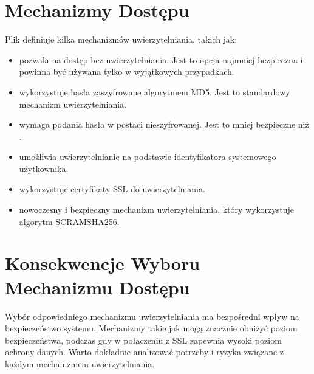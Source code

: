 \documentclass[letterpaper,10pt,polish]{sphinxmanual}
\begin{document}
\section{Mechanizmy Dostępu}
\label{\detokenize{sprawozdanie/source/rozdzialy/rozdzial1:mechanizmy-dostepu}}
\sphinxAtStartPar
Plik  definiuje kilka mechanizmów uwierzytelniania,
takich jak:
\begin{itemize}
\item {} 
\sphinxAtStartPar
{} \sphinxhyphen{} pozwala na dostęp bez uwierzytelniania. Jest to opcja
najmniej bezpieczna i powinna być używana tylko w wyjątkowych
przypadkach.

\item {} 
\sphinxAtStartPar
{} \sphinxhyphen{} wykorzystuje hasła zaszyfrowane algorytmem MD5. Jest to
standardowy mechanizm uwierzytelniania.

\item {} 
\sphinxAtStartPar
{} \sphinxhyphen{} wymaga podania hasła w postaci nieszyfrowanej. Jest to
mniej bezpieczne niż .

\item {} 
\sphinxAtStartPar
{} \sphinxhyphen{} umożliwia uwierzytelnianie na podstawie identyfikatora
systemowego użytkownika.

\item {} 
\sphinxAtStartPar
{} \sphinxhyphen{} wykorzystuje certyfikaty SSL do uwierzytelniania.

\item {} 
\sphinxAtStartPar
{} \sphinxhyphen{} nowoczesny i bezpieczny mechanizm
uwierzytelniania, który wykorzystuje algorytm SCRAM\sphinxhyphen{}SHA\sphinxhyphen{}256.

\end{itemize}


\section{Konsekwencje Wyboru Mechanizmu Dostępu}
\label{\detokenize{sprawozdanie/source/rozdzialy/rozdzial1:konsekwencje-wyboru-mechanizmu-dostepu}}
\sphinxAtStartPar
Wybór odpowiedniego mechanizmu uwierzytelniania ma bezpośredni wpływ na
bezpieczeństwo systemu. Mechanizmy takie jak  mogą znacznie
obniżyć poziom bezpieczeństwa, podczas gdy  w połączeniu z SSL
zapewnia wysoki poziom ochrony danych. Warto dokładnie analizować
potrzeby i ryzyka związane z każdym mechanizmem uwierzytelniania.
\end{document}
